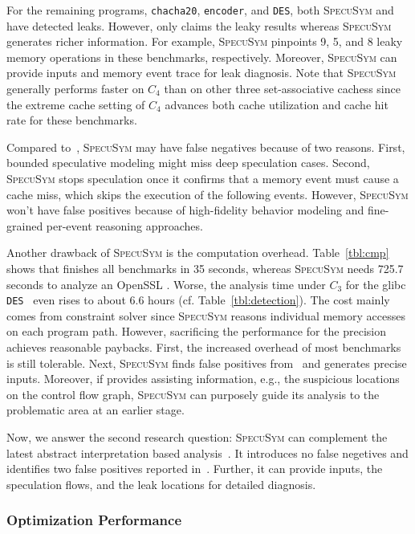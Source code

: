 \documentclass[sigconf]{acmart}
\newcommand{\SpecuSym}{\textsc{SpecuSym} }
\begin{document}
For the remaining programs, \texttt{chacha20}, \texttt{encoder}, and \texttt{DES}, 
both \SpecuSym and~\cite{WuW19} have detected leaks. However, \cite{WuW19} only 
claims the leaky results whereas \SpecuSym generates richer information. For example, 
\SpecuSym pinpoints 9, 5, and 8 leaky memory operations in these benchmarks, respectively. 
Moreover, \SpecuSym can provide inputs and memory event trace for leak diagnosis. Note 
that \SpecuSym generally performs faster on $C_4$ than on other three set-associative 
cachess since the extreme cache setting of $C_4$ advances both cache utilization and 
cache hit rate for these benchmarks. 


Compared to~\cite{WuW19}, \SpecuSym may have false negatives because of two reasons. 
First, bounded speculative modeling might miss deep speculation cases. Second, \SpecuSym 
stops speculation once it confirms that a memory event must cause a cache miss, which 
skips the execution of the following events. However, \SpecuSym won't have false 
positives because of high-fidelity behavior modeling and fine-grained per-event 
reasoning approaches. 



Another drawback of \SpecuSym is the computation overhead. Table~\ref{tbl:cmp} shows 
that \cite{WuW19} finishes all benchmarks in 35 seconds, whereas \SpecuSym needs 
725.7 seconds to analyze an OpenSSL {}. Worse, the analysis time under 
$C_3$ for the glibc \texttt{DES}~\cite{glibc} even rises to about 6.6 hours (cf.
Table~\ref{tbl:detection}). The cost mainly comes from constraint solver since 
\SpecuSym reasons individual memory accesses on each program path. However, 
sacrificing the performance for the precision achieves reasonable paybacks. First, 
the increased overhead of most benchmarks is still tolerable. Next, \SpecuSym finds 
false positives from~\cite{WuW19} and generates precise inputs. Moreover, if
\cite{WuW19} provides assisting information, e.g., the suspicious locations on the 
control flow graph, \SpecuSym can purposely guide its analysis to the problematic 
area at an earlier stage. 


Now, we answer the second research question: \SpecuSym can complement the latest 
abstract interpretation based analysis~\cite{WuW19}. It introduces no false negetives 
and identifies two false positives reported in~\cite{WuW19}. Further, it can provide
inputs, the speculation flows, and the leak locations for detailed diagnosis.


\subsubsection{Optimization Performance}
\label{sec:opt_perform}
\end{document}
